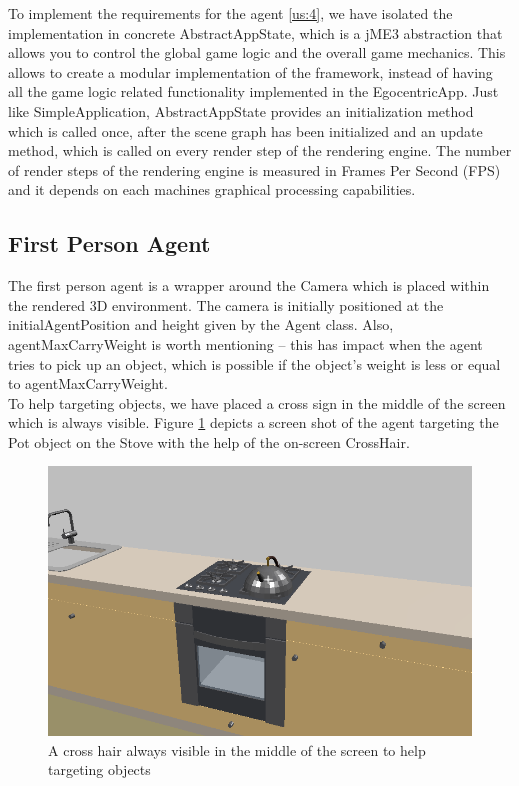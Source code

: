 To implement the requirements for the agent \ref{us:4}, we have isolated the implementation in concrete AbstractAppState, which is a jME3 abstraction that allows you to control the global game logic and the overall game mechanics. This allows to create a modular implementation of the framework, instead of having all the game logic related functionality implemented in the EgocentricApp. Just like SimpleApplication, AbstractAppState provides an initialization method which is called once, after the scene graph has been initialized and an update method, which is called on every render step of the rendering engine. The number of render steps of the rendering engine is measured in Frames Per Second (FPS) and it depends on each machines graphical processing capabilities.\\

\subsection{First Person Agent} %
\label{subsec:impl_the_first_agent}
The first person agent is a wrapper around the Camera which is placed within the rendered 3D environment. The camera is initially positioned at the initialAgentPosition and height given by the Agent class. Also, agentMaxCarryWeight is worth mentioning -- this has impact when the agent tries to pick up an object, which is possible if the object's weight is less or equal to agentMaxCarryWeight.\\

To help targeting objects, we have placed a cross sign in the middle of the screen which is always visible. Figure \ref{fig:impl_crosshair} depicts a screen shot of the agent targeting the Pot object on the Stove with the help of the on-screen CrossHair.
\begin{figure}[H]
	\centering
	\includegraphics[width=0.8\linewidth]{gfx/Chapter4/aiming}
	\caption{A cross hair always visible in the middle of the screen to help targeting objects}
	\label{fig:impl_crosshair}
\end{figure}

